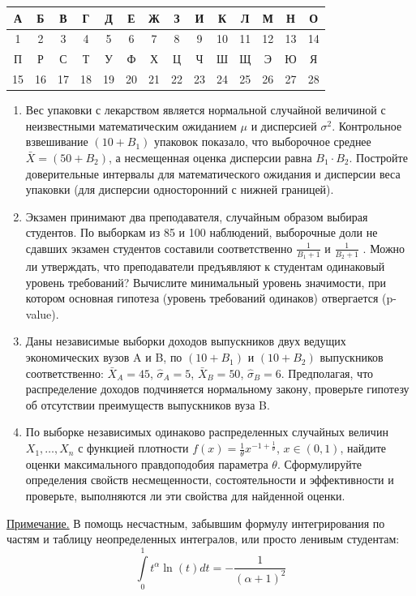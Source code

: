 \begin{center}
\begin{tabular}{|c|c|c|c|c|c|c|c|c|c|c|c|c|c|}
\hline  А & Б & В & Г & Д & Е & Ж & З & И & К & Л & М & Н & О \\
\hline 1 & 2 & 3 & 4 & 5 & 6 & 7 & 8 & 9 & 10 & 11 & 12 & 13 & 14 \\
\hline  П & Р & С & Т & У & Ф & Х & Ц & Ч & Ш & Щ & Э & Ю & Я \\
\hline 15& 16  &  17 &  18&  19&  20&  21& 22 & 23 &  24& 25 & 26  &  27 & 28 \\
\hline
\end{tabular}
\end{center}

\begin{enumerate}
\item Вес упаковки с лекарством является нормальной случайной величиной с
неизвестными математическим ожиданием  $\mu$ и дисперсией $\sigma^2$. Контрольное
взвешивание $(10+B_1)$ упаковок показало, что выборочное среднее  $\bar{X} =
(50+B_2)$, а  несмещенная оценка дисперсии равна $B_1\cdot B_2$. Постройте
доверительные интервалы для математического ожидания и дисперсии веса упаковки
(для дисперсии односторонний с нижней границей).

\item Экзамен принимают два преподавателя, случайным образом выбирая студентов.
По выборкам из 85 и 100 наблюдений, выборочные доли не сдавших экзамен студентов
составили соответственно $\frac{1}{B_1+1}$ и $\frac{1}{B_2+1}$ . Можно ли утверждать,
что преподаватели предъявляют к студентам одинаковый уровень требований? Вычислите
минимальный уровень значимости, при котором основная гипотеза (уровень требований одинаков)
отвергается (p-value).

\item Даны независимые выборки доходов выпускников двух ведущих экономических вузов
A и B, по $(10+B_1)$ и $(10+B_2)$ выпускников соответственно: $\bar{X}_A=45$,
$\hat{\sigma}_A=5$, $\bar{X}_B=50$, $\hat{\sigma}_B=6$.
Предполагая, что распределение доходов подчиняется нормальному закону, проверьте
гипотезу об отсутствии преимуществ выпускников вуза B.

\item 	По выборке независимых одинаково распределенных случайных величин
$X_1,\dots,X_n$ с функцией плотности $f(x)=\frac{1}{\theta} x^{-1+\frac{1}{\theta}}$,
$x\in(0, 1)$, найдите оценки максимального правдоподобия параметра $\theta$.
Сформулируйте определения свойств несмещенности, состоятельности и эффективности
и проверьте, выполняются ли эти свойства для найденной оценки.
\end{enumerate}
\underline{Примечание.} В помощь несчастным, забывшим формулу интегрирования по
частям и таблицу неопределенных интегралов, или просто ленивым студентам:
\[
\int\limits_{0}^1 t^\alpha \ln (t) dt = -\frac{1}{(\alpha+1)^2}
\]

